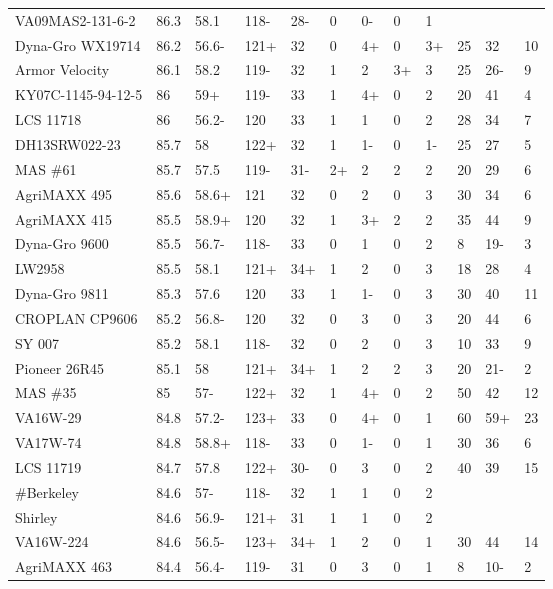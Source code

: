 \documentclass[12pt, letterpaper]{article}
\begin{document}
\begin{landscape}
\begin{ThreePartTable}
\begin{longtable}{llllllllllll}
  VA09MAS2-131-6-2 & 86.3 & 58.1 & 118- & 28- & 0 & 0- & 0 & 1 &  &  &  \\ 
  Dyna-Gro WX19714 & 86.2 & 56.6- & 121+ & 32 & 0 & 4+ & 0 & 3+ & 25 & 32 & 10 \\ 
  Armor Velocity & 86.1 & 58.2 & 119- & 32 & 1 & 2 & 3+ & 3 & 25 & 26- & 9 \\ 
  KY07C-1145-94-12-5 & 86 & 59+ & 119- & 33 & 1 & 4+ & 0 & 2 & 20 & 41 & 4 \\ 
  LCS 11718 & 86 & 56.2- & 120 & 33 & 1 & 1 & 0 & 2 & 28 & 34 & 7 \\ 
  DH13SRW022-23 & 85.7 & 58 & 122+ & 32 & 1 & 1- & 0 & 1- & 25 & 27 & 5 \\ 
  MAS \#61 & 85.7 & 57.5 & 119- & 31- & 2+ & 2 & 2 & 2 & 20 & 29 & 6 \\ 
  AgriMAXX 495 & 85.6 & 58.6+ & 121 & 32 & 0 & 2 & 0 & 3 & 30 & 34 & 6 \\ 
  AgriMAXX 415 & 85.5 & 58.9+ & 120 & 32 & 1 & 3+ & 2 & 2 & 35 & 44 & 9 \\ 
  Dyna-Gro 9600 & 85.5 & 56.7- & 118- & 33 & 0 & 1 & 0 & 2 & 8 & 19- & 3 \\ 
  LW2958 & 85.5 & 58.1 & 121+ & 34+ & 1 & 2 & 0 & 3 & 18 & 28 & 4 \\ 
  Dyna-Gro 9811 & 85.3 & 57.6 & 120 & 33 & 1 & 1- & 0 & 3 & 30 & 40 & 11 \\ 
  CROPLAN CP9606 & 85.2 & 56.8- & 120 & 32 & 0 & 3 & 0 & 3 & 20 & 44 & 6 \\
  SY 007 & 85.2 & 58.1 & 118- & 32 & 0 & 2 & 0 & 3 & 10 & 33 & 9 \\ 
  Pioneer 26R45 & 85.1 & 58 & 121+ & 34+ & 1 & 2 & 2 & 3 & 20 & 21- & 2 \\ 
  MAS \#35 & 85 & 57- & 122+ & 32 & 1 & 4+ & 0 & 2 & 50 & 42 & 12 \\ 
  VA16W-29 & 84.8 & 57.2- & 123+ & 33 & 0 & 4+ & 0 & 1 & 60 & 59+ & 23 \\ 
  VA17W-74 & 84.8 & 58.8+ & 118- & 33 & 0 & 1- & 0 & 1 & 30 & 36 & 6 \\ 
  LCS 11719 & 84.7 & 57.8 & 122+ & 30- & 0 & 3 & 0 & 2 & 40 & 39 & 15 \\ 
  \#Berkeley & 84.6 & 57- & 118- & 32 & 1 & 1 & 0 & 2 &  &  &  \\ 
  Shirley & 84.6 & 56.9- & 121+ & 31 & 1 & 1 & 0 & 2 &  &  &  \\ 
  VA16W-224 & 84.6 & 56.5- & 123+ & 34+ & 1 & 2 & 0 & 1 & 30 & 44 & 14 \\ 
  AgriMAXX 463 & 84.4 & 56.4- & 119- & 31 & 0 & 3 & 0 & 1 & 8 & 10- & 2 \\ 

\end{longtable}
\end{ThreePartTable}
\end{landscape}
\end{document}
